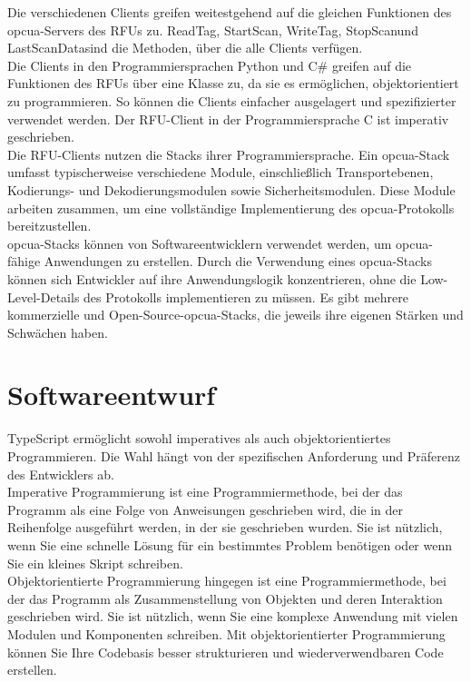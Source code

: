 Die verschiedenen Clients greifen weitestgehend auf die gleichen Funktionen des \ac{opcua}-Servers des RFUs zu. \frqq ReadTag\flqq, \frqq StartScan\flqq, \frqq WriteTag\flqq, \frqq StopScan\flqq und \frqq LastScanData\flqq sind die Methoden, über die alle Clients verfügen.\\

Die Clients in den Programmiersprachen Python und C\# greifen auf die Funktionen des RFUs über eine Klasse zu, da sie es ermöglichen, objektorientiert zu programmieren. So können die Clients einfacher ausgelagert und spezifizierter verwendet werden. Der RFU-Client in der Programmiersprache C ist imperativ geschrieben.\\

Die RFU-Clients nutzen die Stacks ihrer Programmiersprache. Ein \ac{opcua}-Stack umfasst typischerweise verschiedene Module, einschließlich Transportebenen, Kodierungs- und Dekodierungsmodulen sowie Sicherheitsmodulen. Diese Module arbeiten zusammen, um eine vollständige Implementierung des \ac{opcua}-Protokolls bereitzustellen.\\

\ac{opcua}-Stacks können von Softwareentwicklern verwendet werden, um \ac{opcua}-fähige Anwendungen zu erstellen. Durch die Verwendung eines \ac{opcua}-Stacks können sich Entwickler auf ihre Anwendungslogik konzentrieren, ohne die Low-Level-Details des Protokolls implementieren zu müssen. Es gibt mehrere kommerzielle und Open-Source-\ac{opcua}-Stacks, die jeweils ihre eigenen Stärken und Schwächen haben.\\




\section{Softwareentwurf}


TypeScript ermöglicht sowohl imperatives als auch objektorientiertes Programmieren. Die Wahl hängt von der spezifischen Anforderung und Präferenz des Entwicklers ab.\\

Imperative Programmierung ist eine Programmiermethode, bei der das Programm als eine Folge von Anweisungen geschrieben wird, die in der Reihenfolge ausgeführt werden, in der sie geschrieben wurden. Sie ist nützlich, wenn Sie eine schnelle Lösung für ein bestimmtes Problem benötigen oder wenn Sie ein kleines Skript schreiben.\\

Objektorientierte Programmierung hingegen ist eine Programmiermethode, bei der das Programm als Zusammenstellung von Objekten und deren Interaktion geschrieben wird. Sie ist nützlich, wenn Sie eine komplexe Anwendung mit vielen Modulen und Komponenten schreiben. Mit objektorientierter Programmierung können Sie Ihre Codebasis besser strukturieren und wiederverwendbaren Code erstellen.\\

